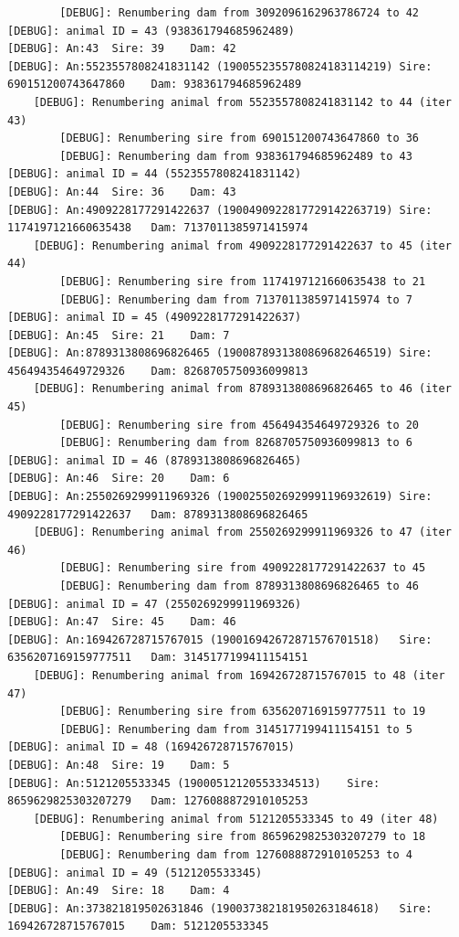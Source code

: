 \documentclass[
  letterpaper,
  DIV=11,
  numbers=noendperiod]{scrreprt}
\begin{document}
\begin{codelisting}
{\begin{verbatim}
        [DEBUG]: Renumbering dam from 3092096162963786724 to 42
[DEBUG]: animal ID = 43 (938361794685962489)
[DEBUG]: An:43  Sire: 39    Dam: 42
[DEBUG]: An:5523557808241831142 (1900552355780824183114219) Sire: 690151200743647860    Dam: 938361794685962489
    [DEBUG]: Renumbering animal from 5523557808241831142 to 44 (iter 43)
        [DEBUG]: Renumbering sire from 690151200743647860 to 36
        [DEBUG]: Renumbering dam from 938361794685962489 to 43
[DEBUG]: animal ID = 44 (5523557808241831142)
[DEBUG]: An:44  Sire: 36    Dam: 43
[DEBUG]: An:4909228177291422637 (1900490922817729142263719) Sire: 1174197121660635438   Dam: 7137011385971415974
    [DEBUG]: Renumbering animal from 4909228177291422637 to 45 (iter 44)
        [DEBUG]: Renumbering sire from 1174197121660635438 to 21
        [DEBUG]: Renumbering dam from 7137011385971415974 to 7
[DEBUG]: animal ID = 45 (4909228177291422637)
[DEBUG]: An:45  Sire: 21    Dam: 7
[DEBUG]: An:8789313808696826465 (1900878931380869682646519) Sire: 456494354649729326    Dam: 8268705750936099813
    [DEBUG]: Renumbering animal from 8789313808696826465 to 46 (iter 45)
        [DEBUG]: Renumbering sire from 456494354649729326 to 20
        [DEBUG]: Renumbering dam from 8268705750936099813 to 6
[DEBUG]: animal ID = 46 (8789313808696826465)
[DEBUG]: An:46  Sire: 20    Dam: 6
[DEBUG]: An:2550269299911969326 (1900255026929991196932619) Sire: 4909228177291422637   Dam: 8789313808696826465
    [DEBUG]: Renumbering animal from 2550269299911969326 to 47 (iter 46)
        [DEBUG]: Renumbering sire from 4909228177291422637 to 45
        [DEBUG]: Renumbering dam from 8789313808696826465 to 46
[DEBUG]: animal ID = 47 (2550269299911969326)
[DEBUG]: An:47  Sire: 45    Dam: 46
[DEBUG]: An:169426728715767015 (190016942672871576701518)   Sire: 6356207169159777511   Dam: 3145177199411154151
    [DEBUG]: Renumbering animal from 169426728715767015 to 48 (iter 47)
        [DEBUG]: Renumbering sire from 6356207169159777511 to 19
        [DEBUG]: Renumbering dam from 3145177199411154151 to 5
[DEBUG]: animal ID = 48 (169426728715767015)
[DEBUG]: An:48  Sire: 19    Dam: 5
[DEBUG]: An:5121205533345 (19000512120553334513)    Sire: 8659629825303207279   Dam: 1276088872910105253
    [DEBUG]: Renumbering animal from 5121205533345 to 49 (iter 48)
        [DEBUG]: Renumbering sire from 8659629825303207279 to 18
        [DEBUG]: Renumbering dam from 1276088872910105253 to 4
[DEBUG]: animal ID = 49 (5121205533345)
[DEBUG]: An:49  Sire: 18    Dam: 4
[DEBUG]: An:373821819502631846 (190037382181950263184618)   Sire: 169426728715767015    Dam: 5121205533345

\end{verbatim}}
\end{codelisting}
\end{document}
